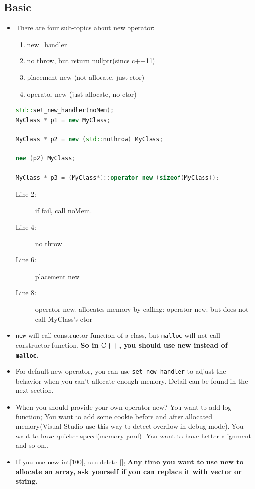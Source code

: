 \documentclass[a4paper,11pt,twoside]{book}
\begin{document}
\subsection{Basic}
\begin{itemize}
	
	\item There are four sub-topics about new operator:
	\begin{enumerate}
		\item new\_handler
		\item no throw, but return nullptr(since c++11)
		\item placement new (not allocate, just ctor)
		\item operator new (just allocate, no ctor)
	\end{enumerate}
	
\begin{lstlisting}[frame=single, language=c++]
std::set_new_handler(noMem);
MyClass * p1 = new MyClass;  

MyClass * p2 = new (std::nothrow) MyClass; 

new (p2) MyClass;  

MyClass * p3 = (MyClass*)::operator new (sizeof(MyClass));
\end{lstlisting}
\begin{description}
	\item[Line 2:] if fail, call noMem.
	\item[Line 4:] no throw
	\item[Line 6:] placement new
	\item[Line 8:] operator new, allocates memory by calling: operator new. but does not call MyClass's ctor
\end{description}	
	\item \texttt{new} will call constructor function of a class, but \texttt{malloc} will not call constructor function.  \textbf{So in C++, you should use new instead of \texttt{malloc}.}
	
	\item For default new operator, you can use \texttt{set\_new\_handler} to adjust the behavior when you can't allocate enough memory. Detail can be found in the next section.
	
	\item When you should provide your own operator new?  You want to add log function; You want to add some cookie before and after allocated memory(Visual Studio use this way to detect overflow in debug mode). You want to have quicker speed(memory pool). You want to have better alignment and so on..
	
	\item If you use new int[100], use delete [];  \textbf{Any time you want to use new to allocate an array, ask yourself if you can replace it with vector or string.}
\end{itemize}
\end{document}
